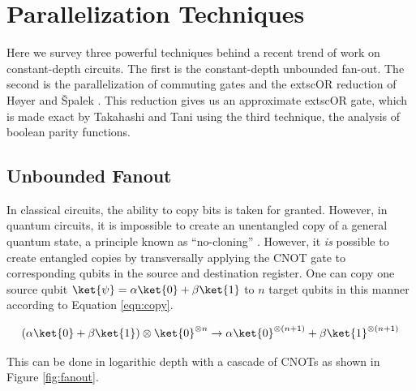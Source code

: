 \section{Parallelization Techniques}
\label{sec:parallel}

Here we survey three powerful techniques behind a recent trend of work on
constant-depth circuits. The first is the constant-depth unbounded fan-out.
The second is the parallelization of
commuting gates and the 	extsc{OR} reduction of H{\o}yer and {\v S}palek
\cite{Hoyer2002}. This reduction gives us an approximate 	extsc{OR} gate,
which is made exact by Takahashi and Tani \cite{Takahashi2011} using the
third technique, the analysis of boolean parity functions.

\subsection{Unbounded Fanout}

In classical
circuits, the ability to copy bits is taken for granted. However,
in quantum circuits,
it is impossible to create an unentangled copy of a general quantum state, a
principle known as ``no-cloning'' \cite{Nielsen2000}. However,
it \emph{is} possible to create entangled copies by transversally applying
the CNOT gate to corresponding qubits in the source and destination register.
One can copy one source qubit $\ket{\psi} = \alpha \ket{0} + \beta \ket{1}$
to $n$ target qubits in this manner according to Equation \ref{eqn:copy}.

\begin{equation}
(\alpha \ket{0} + \beta \ket{1}) \otimes \ket{0}^{\otimes n} \rightarrow
\alpha \ket{0}^{\otimes (n+1)} + \beta \ket{1}^{\otimes (n+1)}
\label{eqn:copy}
\end{equation}

This can be done in logarithic depth with a cascade of CNOTs as shown
in Figure \ref{fig:fanout}.

